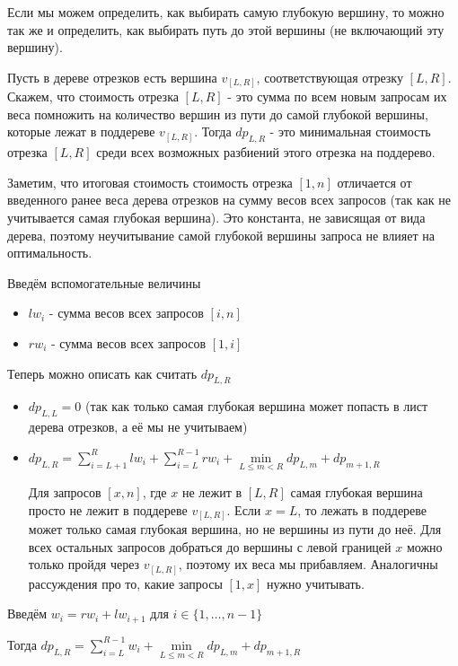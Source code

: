 Если мы можем определить, как выбирать самую глубокую вершину, то можно так же и определить, как выбирать путь до этой вершины (не включающий эту вершину).

Пусть в дереве отрезков есть вершина $v_{[L, R]}$, соответствующая отрезку $[L, R]$. Скажем, что стоимость отрезка $[L, R]$ - это сумма по всем новым запросам их веса помножить на количество вершин из пути до самой глубокой вершины, которые лежат в поддереве $v_{[L, R]}$. Тогда $dp_{L, R}$ - это минимальная стоимость отрезка $[L, R]$ среди всех возможных разбиений этого отрезка на поддерево.

Заметим, что итоговая стоимость стоимость отрезка $[1, n]$ отличается от введенного ранее веса дерева отрезков на сумму весов всех запросов (так как не учитывается самая глубокая вершина). Это константа, не зависящая от вида дерева, поэтому неучитывание самой глубокой вершины запроса не влияет на оптимальность.

Введём вспомогательные величины
\begin{itemize}
    \item $lw_i$ - сумма весов всех запросов $[i, n]$
    \item $rw_i$ - сумма весов всех запросов $[1, i]$
\end{itemize}

Теперь можно описать как считать $dp_{L, R}$

\begin{itemize}
    \item $dp_{L, L} = 0$ (так как только самая глубокая вершина может попасть в лист дерева отрезков,
    а её мы не учитываем)
    \item $dp_{L, R} = \sum \limits_{i = L + 1}^R lw_i + \sum \limits_{i = L}^{R - 1} rw_i
    + \min \limits_{L \leqslant m < R} {dp_{L, m} + dp_{m + 1, R}}$
    
    Для запросов $[x, n]$, где $x$ не лежит в $[L, R]$ самая глубокая вершина просто не лежит в поддереве $v_{[L, R]}$.
    Если $x = L$, то лежать в поддереве может только самая глубокая вершина, но не вершины из пути до неё. Для всех     остальных запросов добраться до вершины с левой границей $x$ можно только пройдя через $v_{[L, R]}$, поэтому их     веса мы прибавляем.
    Аналогичны рассуждения про то, какие запросы $[1, x]$ нужно учитывать.
\end{itemize}

Введём $w_i = rw_i + lw_{i + 1}$ для $i \in \{1,\dots,n-1\}$

Тогда $dp_{L, R} = \sum \limits_{i = L}^{R - 1} w_i + \min \limits_{L \leqslant m < R} {dp_{L, m} + dp_{m + 1, R}}$

